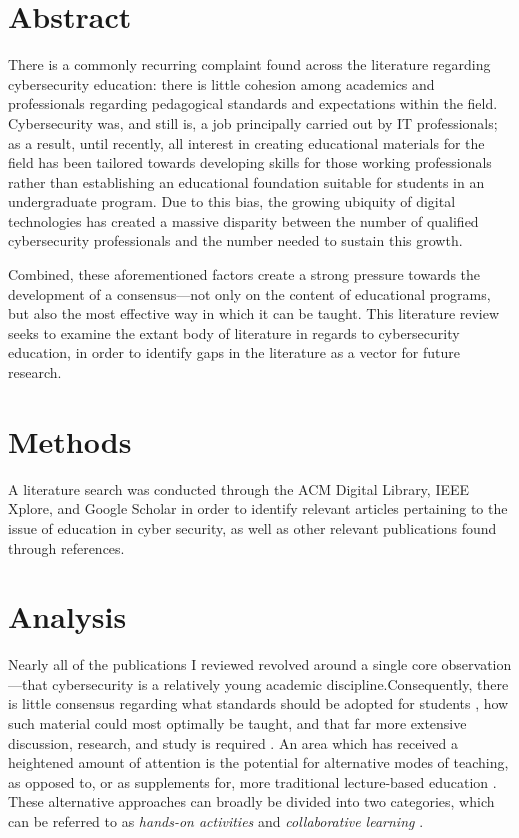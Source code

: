\section{Abstract}

    There is a commonly recurring complaint found across the literature regarding cybersecurity education: there is little cohesion among academics and professionals regarding pedagogical standards and expectations within the field. Cybersecurity was, and still is, a job principally carried out by IT professionals; as a result, until recently, all interest in creating educational materials for the field has been tailored towards developing skills for those working professionals rather than establishing an educational foundation suitable for students in an undergraduate program. Due to this bias, the growing ubiquity of digital technologies has created a massive disparity between the number of qualified cybersecurity professionals and the number needed to sustain this growth.  
    
    Combined, these aforementioned factors create a strong pressure towards the development of a consensus---not only on the content of educational programs, but also the most effective way in which it can be taught. This literature review seeks to examine the extant body of literature in regards to cybersecurity education, in order to identify gaps in the literature as a vector for future research.

\section{Methods}

    A literature search was conducted through the ACM Digital Library, IEEE Xplore, and Google Scholar in order to identify relevant articles pertaining to the issue of education in cyber security, as well as other relevant publications found through references.

\section{Analysis}

    Nearly all of the publications I reviewed revolved around a single core observation---that cybersecurity is a relatively young academic discipline.Consequently, there is little consensus regarding what standards should be adopted for students \cite{R-Raj}, how such material could most optimally be taught, and that far more extensive discussion, research, and study is required \cite{Z-Zeng}. An area which has received a heightened amount of attention is the potential for alternative modes of teaching, as opposed to, or as supplements for, more traditional lecture-based education \cite{Z-Zeng,N-Eliot,E-Gavas,C-Herr,K-Chung, C-Kussmaul,K-Leune,B-Payne,L-Thomas}. These alternative approaches can broadly be divided into two categories, which can be referred to as \emph{hands-on activities} and \emph{collaborative learning} \cite{P-Deshpande,C-Kussmaul,B-Payne}.

